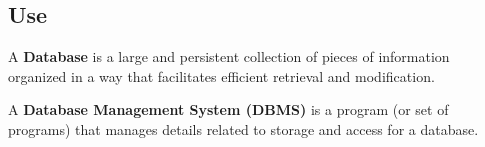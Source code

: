 \documentclass[12pt]{article}
\begin{document}
\subsection*{Use}

\begin{mydef}
    A \textbf{Database} is a large and persistent collection of pieces of
    information organized in a way that facilitates efficient retrieval and
    modification. \newline
\end{mydef}

\begin{mydef}
    A \textbf{Database Management System (DBMS)} is a program (or set of
    programs) that manages details related to storage and access for a database.
    \newline
\end{mydef}
\end{document}
